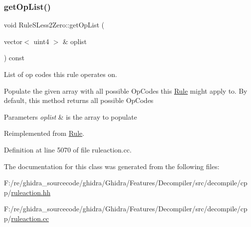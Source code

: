 \subsubsection{\texorpdfstring{getOpList()}{getOpList()}}
{\footnotesize\ttfamily void Rule\+S\+Less2\+Zero\+::get\+Op\+List (\begin{DoxyParamCaption}\item[{vector$<$ uint4 $>$ \&}]{oplist }\end{DoxyParamCaption}) const\hspace{0.3cm}{\ttfamily [virtual]}}



List of op codes this rule operates on. 

Populate the given array with all possible Op\+Codes this \mbox{\hyperlink{class_rule}{Rule}} might apply to. By default, this method returns all possible Op\+Codes 
\begin{DoxyParams}{Parameters}
{\em oplist} & is the array to populate \\
\hline
\end{DoxyParams}


Reimplemented from \mbox{\hyperlink{class_rule_a4023bfc7825de0ab866790551856d10e}{Rule}}.



Definition at line 5070 of file ruleaction.\+cc.



The documentation for this class was generated from the following files\+:\begin{DoxyCompactItemize}
\item 
F\+:/re/ghidra\+\_\+sourcecode/ghidra/\+Ghidra/\+Features/\+Decompiler/src/decompile/cpp/\mbox{\hyperlink{ruleaction_8hh}{ruleaction.\+hh}}\item 
F\+:/re/ghidra\+\_\+sourcecode/ghidra/\+Ghidra/\+Features/\+Decompiler/src/decompile/cpp/\mbox{\hyperlink{ruleaction_8cc}{ruleaction.\+cc}}\end{DoxyCompactItemize}
